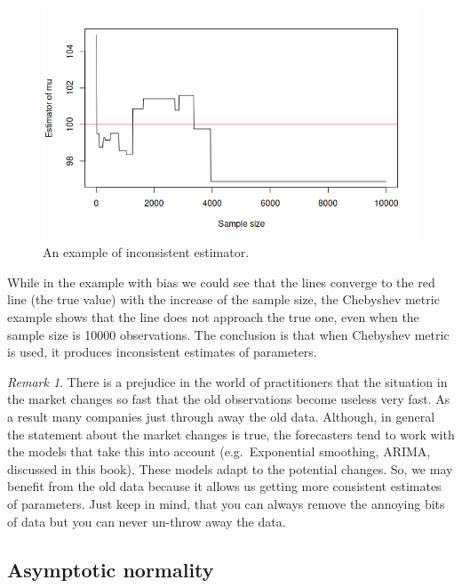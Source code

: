 \documentclass[
]{book}
\theoremstyle{definition}
\theoremstyle{definition}
\theoremstyle{definition}
\theoremstyle{definition}
\theoremstyle{remark}
\newtheorem*{remark}{Remark}
\begin{document}
\begin{figure}
\centering
\includegraphics{images/02-statistics-consistency.png}
\caption{\label{fig:statsConsistency}An example of inconsistent estimator.}
\end{figure}

While in the example with bias we could see that the lines converge to the red line (the true value) with the increase of the sample size, the Chebyshev metric example shows that the line does not approach the true one, even when the sample size is 10000 observations. The conclusion is that when Chebyshev metric is used, it produces inconsistent estimates of parameters.

\begin{remark}
There is a prejudice in the world of practitioners that the situation in the market changes so fast that the old observations become useless very fast. As a result many companies just through away the old data. Although, in general the statement about the market changes is true, the forecasters tend to work with the models that take this into account (e.g.~Exponential smoothing, ARIMA, discussed in this book). These models adapt to the potential changes. So, we may benefit from the old data because it allows us getting more consistent estimates of parameters. Just keep in mind, that you can always remove the annoying bits of data but you can never un-throw away the data.
\end{remark}

\hypertarget{asymptoticNormality}{%
\subsection{Asymptotic normality}\label{asymptoticNormality}}
\end{document}
